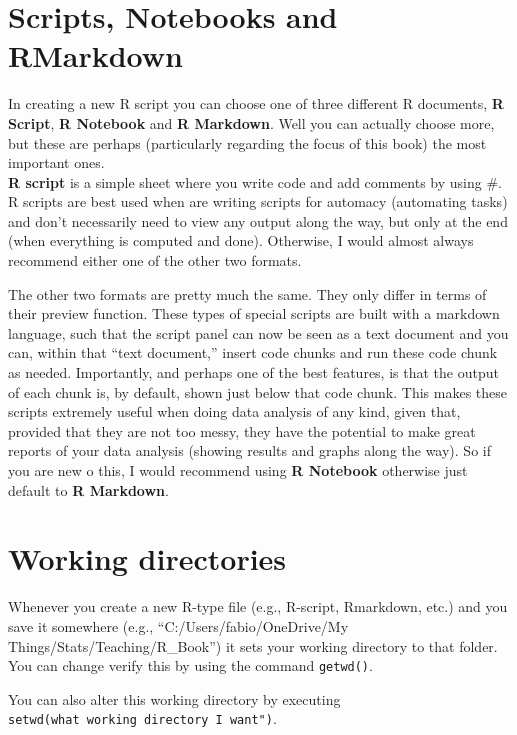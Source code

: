 \documentclass[
]{book}
\begin{document}
\hypertarget{scripts-notebooks-and-rmarkdown}{%
\section{Scripts, Notebooks and RMarkdown}\label{scripts-notebooks-and-rmarkdown}}

In creating a new R script you can choose one of three different R documents, \textbf{R Script}, \textbf{R Notebook} and \textbf{R Markdown}.
Well you can actually choose more, but these are perhaps (particularly regarding the focus of this book) the most important ones.\\
\textbf{R script} is a simple sheet where you write code and add comments by using \#.
R scripts are best used when are writing scripts for automacy (automating tasks) and don't necessarily need to view any output along the way, but only at the end (when everything is computed and done).
Otherwise, I would almost always recommend either one of the other two formats.

The other two formats are pretty much the same.
They only differ in terms of their preview function.
These types of special scripts are built with a markdown language, such that the script panel can now be seen as a text document and you can, within that ``text document,'' insert code chunks and run these code chunk as needed.
Importantly, and perhaps one of the best features, is that the output of each chunk is, by default, shown just below that code chunk.
This makes these scripts extremely useful when doing data analysis of any kind, given that, provided that they are not too messy, they have the potential to make great reports of your data analysis (showing results and graphs along the way).
So if you are new o this, I would recommend using \textbf{R Notebook} otherwise just default to \textbf{R Markdown}.

\hypertarget{working-directories}{%
\section{Working directories}\label{working-directories}}

Whenever you create a new R-type file (e.g., R-script, Rmarkdown, etc.) and you save it somewhere (e.g., ``C:/Users/fabio/OneDrive/My Things/Stats/Teaching/R\_Book'') it sets your working directory to that folder.
You can change verify this by using the command \texttt{getwd()}.

You can also alter this working directory by executing \texttt{setwd(\textquotesingle{}what\ working\ directory\ I\ want")}.
\end{document}
